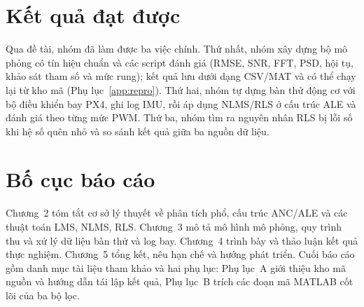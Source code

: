 \documentclass[../main.tex]{subfiles}
\begin{document}
\section{Kết quả đạt được}

Qua đề tài, nhóm đã làm được ba việc chính. Thứ nhất, nhóm xây dựng bộ mô phỏng có tín hiệu chuẩn và các script đánh giá (RMSE, SNR, FFT, PSD, hội tụ, khảo sát tham số và mức rung); kết quả lưu dưới dạng CSV/MAT và có thể chạy lại từ kho mã (Phụ lục~\ref{app:repro}). Thứ hai, nhóm tự dựng bàn thử động cơ với bộ điều khiển bay PX4, ghi log IMU, rồi áp dụng NLMS/RLS ở cấu trúc ALE và đánh giá theo từng mức PWM. Thứ ba, nhóm tìm ra nguyên nhân RLS bị lỗi số khi hệ số quên nhỏ và so sánh kết quả giữa ba nguồn dữ liệu.

\section{Bố cục báo cáo}

Chương~2 tóm tắt cơ sở lý thuyết về phân tích phổ, cấu trúc ANC/ALE và các thuật toán LMS, NLMS, RLS. Chương~3 mô tả mô hình mô phỏng, quy trình thu và xử lý dữ liệu bàn thử và log bay. Chương~4 trình bày và thảo luận kết quả thực nghiệm. Chương~5 tổng kết, nêu hạn chế và hướng phát triển. Cuối báo cáo gồm danh mục tài liệu tham khảo và hai phụ lục: Phụ lục~A giới thiệu kho mã nguồn và hướng dẫn tái lập kết quả, Phụ lục~B trích các đoạn mã MATLAB cốt lõi của ba bộ lọc.
\end{document}
